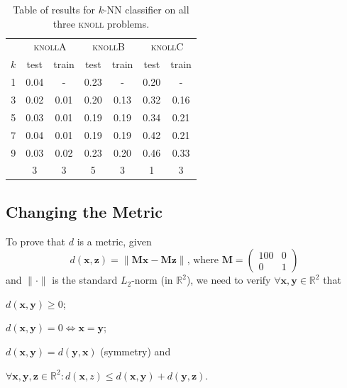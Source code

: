 \documentclass{article}
\newcommand{\vect}[1]{\ensuremath{\boldsymbol{\mathbf{#1}}}\xspace}
\newcommand{\knollA}{\textsc{knollA}\xspace}
\newcommand{\knollB}{\textsc{knollB}\xspace}
\newcommand{\knollC}{\textsc{knollC}\xspace}
\begin{document}
\begin{table}
  \centering
  \begin{tabular}{c | c|c | c|c | c|c}
    \hfill & \multicolumn{2}{c|}{\knollA} & \multicolumn{2}{c|}{\knollB} & \multicolumn{2}{c}{\knollC}\\
    $k$ & test & train & test & train & test & train\\\hline
    1 & 0.04 &   -  & 0.23 &   -  & 0.20 &   - \\
    3 & 0.02 & 0.01 & 0.20 & 0.13 & 0.32 & 0.16\\
    5 & 0.03 & 0.01 & 0.19 & 0.19 & 0.34 & 0.21\\
    7 & 0.04 & 0.01 & 0.19 & 0.19 & 0.42 & 0.21\\
    9 & 0.03 & 0.02 & 0.23 & 0.20 & 0.46 & 0.33\\\hline\hline
    \hfill & 3 & 3  &   5  &   3  &   1  &   3 
  \end{tabular}
  \caption{Table of results for $k$-NN classifier on all three \textsc{knoll} problems.}
  \label{tbl:results1}
\end{table}

\subsection{Changing the Metric}

To prove that $d$ is a metric, given
\[
d(\vect{x},\vect{z}) = \|\vect{M}\vect{x} - \vect{M}\vect{z}\|\text{,
  where } \vect{M} = \begin{pmatrix} 100 & 0 \\ 0 & 1\end{pmatrix}
\]
and $\|\cdot\|$ is the standard $L_2$-norm (in $\mathbb{R}^2$), we
need to verify $\forall \vect{x},\vect{y}\in \mathbb{R}^2$ that
\begin{inparaenum}[1)]
  \item $d(\vect{x},\vect{y}) \geq 0$; 
  \item $d(\vect{x},\vect{y}) = 0 \Leftrightarrow \vect{x} = \vect{y}$;
  \item $d(\vect{x},\vect{y}) =  d(\vect{y},\vect{x})$ (symmetry) and
  \item $\forall \vect{x},\vect{y},\vect{z} \in \mathbb{R}^2 : d(\vect{x},z) \leq d(\vect{x},\vect{y}) + d(\vect{y},\vect{z})$.
\end{inparaenum}
\end{document}
